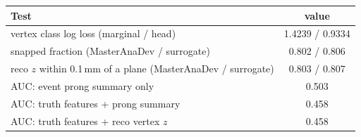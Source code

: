 \begin{tabular}{lc}
\toprule
Test & value \\
\midrule
vertex class log loss (marginal / head) & 1.4239 / 0.9334 \\
snapped fraction (MasterAnaDev / surrogate) & 0.802 / 0.806 \\
reco $z$ within 0.1\,mm of a plane (MasterAnaDev / surrogate) & 0.803 / 0.807 \\
\midrule
AUC: event prong summary only & 0.503 \\
AUC: truth features + prong summary & 0.458 \\
AUC: truth features + reco vertex $z$ & 0.458 \\
\bottomrule
\end{tabular}

